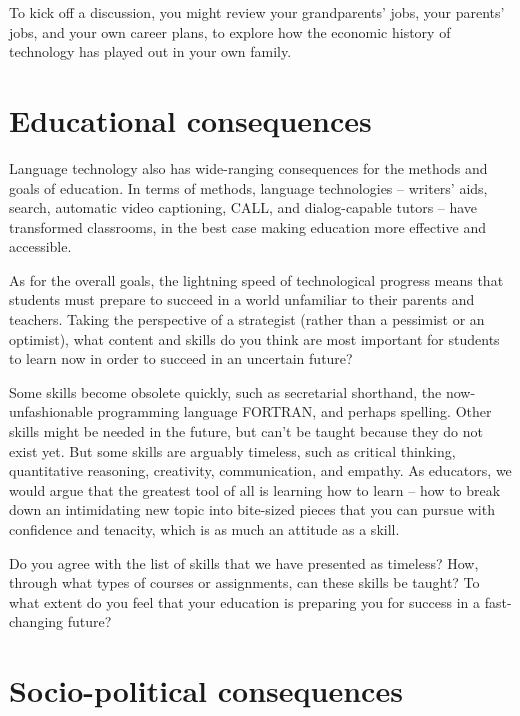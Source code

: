 To kick off a discussion, you might review your grandparents' jobs,  your parents' jobs, and your own career plans, to explore how the economic history of technology has played out in your own family.  




\section{Educational consequences}

Language technology also has wide-ranging consequences for  the methods and goals of education.  In terms of methods,  language technologies -- writers'  aids, search, automatic video captioning, CALL, and dialog-capable tutors --  have transformed classrooms, in the best case making education more effective and accessible.  

As for the overall goals, the lightning speed of technological progress means that students must prepare to succeed in a world unfamiliar to their parents and teachers.  Taking the perspective of a strategist (rather than a pessimist or an optimist), what content and skills do you think are most important for students to learn now in order to succeed in an uncertain future? 

Some skills become obsolete quickly, such as secretarial shorthand,  the now-unfashionable programming language FORTRAN, and perhaps spelling.  Other skills might be needed in the future, but can't be taught because they do not exist yet.  But some skills are arguably timeless, such as critical thinking, quantitative reasoning, creativity, communication, and empathy.  As educators, we would argue that the greatest tool of all is learning how to learn -- how to break down an intimidating new topic into bite-sized pieces that you can pursue with confidence and tenacity, which is as much an attitude as a skill.

Do you agree with the list of skills that we have presented as timeless?  How, through what types of courses or assignments, can these skills be taught?  To what extent do you feel that your education is preparing you for success in a fast-changing future?



\section{Socio-political consequences}


